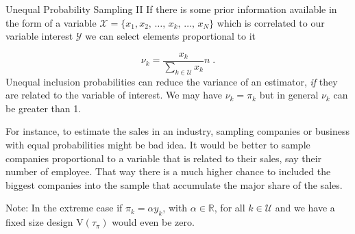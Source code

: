 \documentclass[10pt]{beamer}\usepackage[]{graphicx}\usepackage[]{color}
\newcommand{\V}[1]{\text{V}\left(#1\right)}
\begin{document}
\begin{frame}{Unequal Probability Sampling II}
If there is some prior information available in the form of a variable $\mathcal{X} =  \{ x_1{,}x_2{,}\,\ldots{,}\,x_k{,}\,\ldots{,}\,x_N \}$ which is correlated to our variable interest $\mathcal{Y}$ we can select elements proportional to it

$$\nu_k = \dfrac{x_k}{\sum_{k \in \mathcal{U}} x_k} n \;.$$
Unequal inclusion probabilities can reduce the variance of an estimator, \emph{if} they are related to the variable of interest. We may have $\nu_k=\pi_k$ but in general $\nu_k$ can be greater than 1. \newline

For instance, to estimate the sales in an industry, sampling companies or business with equal probabilities might be bad idea. It would be better to sample companies proportional to a variable that is related to their sales, say their number of employee. That way there is a much higher chance to included the biggest companies into the sample that accumulate the major share of the sales. \newline

Note: In the extreme case if $\pi_k = \alpha y_k$, with  $\alpha \in \mathbb{R}$, for all $k \in \mathcal{U}$ and we have a fixed size design  $\V{ \hat{\tau}_{\pi}}$ would even be zero.

\end{frame}
\end{document}
